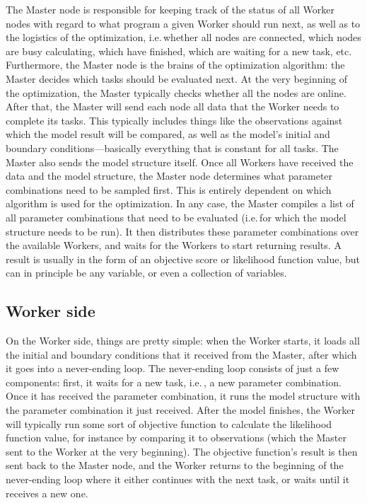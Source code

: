 The Master node is responsible for keeping track of the status of all Worker nodes with regard to what program a given Worker should run next, as well as to the logistics of the optimization, i.e.\,whether all nodes are connected, which nodes are busy calculating, which have finished, which are waiting for a new task, etc. Furthermore, the Master node is the brains of the optimization algorithm: the Master decides which tasks should be evaluated next. At the very beginning of the optimization, the Master typically checks whether all the nodes are online. After that, the Master will send each node all data that the Worker needs to complete its tasks. This typically includes things like the observations against which the model result will be compared, as well as the model's initial and boundary conditions---basically everything that is constant for all tasks. The Master also sends the model structure itself. Once all Workers have received the data and the model structure, the Master node determines what parameter combinations need to be sampled first. This is entirely dependent on which algorithm is used for the optimization. In any case, the Master compiles a list of all parameter combinations that need to be evaluated (i.e.\,for which the model structure needs to be run). It then distributes these parameter combinations over the available Workers, and waits for the Workers to start returning results. A result is usually in the form of an objective score or likelihood function value, but can in principle be any variable, or even a collection of variables.

\subsection{Worker side}


On the Worker side, things are pretty simple: when the Worker starts, it loads all the initial and boundary conditions that it received from the Master, after which it goes into a never-ending loop. The never-ending loop consists of just a few components: first, it waits for a new task, i.e.\,, a new parameter combination. Once it has received the parameter combination, it runs the model structure with the parameter combination it just received. After the model finishes, the Worker will typically run some sort of objective function to calculate the likelihood function value, for instance by comparing it to observations (which the Master sent to the Worker at the very beginning). The objective function's result is then sent back to the Master node, and the Worker returns to the beginning of the never-ending loop where it either continues with the next task, or waits until it receives a new one.




